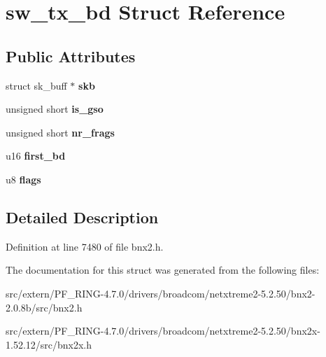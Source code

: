 \hypertarget{structsw__tx__bd}{
\section{sw\_\-tx\_\-bd Struct Reference}
\label{structsw__tx__bd}
}
\subsection*{Public Attributes}
\begin{DoxyCompactItemize}
\item 
\hypertarget{structsw__tx__bd_a47a18c5b8d3300505b5b72c06f40d453}{
struct sk\_\-buff $\ast$ {\bfseries skb}}
\label{structsw__tx__bd_a47a18c5b8d3300505b5b72c06f40d453}

\item 
\hypertarget{structsw__tx__bd_ae7298a394c271425b41347d721d0c481}{
unsigned short {\bfseries is\_\-gso}}
\label{structsw__tx__bd_ae7298a394c271425b41347d721d0c481}

\item 
\hypertarget{structsw__tx__bd_a0325f6895464837c91bc83b95c04e159}{
unsigned short {\bfseries nr\_\-frags}}
\label{structsw__tx__bd_a0325f6895464837c91bc83b95c04e159}

\item 
\hypertarget{structsw__tx__bd_a72bc187a7b6099aba43c32c58c0c75af}{
u16 {\bfseries first\_\-bd}}
\label{structsw__tx__bd_a72bc187a7b6099aba43c32c58c0c75af}

\item 
\hypertarget{structsw__tx__bd_ac604ddedffc0c849708bef96039ffc78}{
u8 {\bfseries flags}}
\label{structsw__tx__bd_ac604ddedffc0c849708bef96039ffc78}

\end{DoxyCompactItemize}


\subsection{Detailed Description}


Definition at line 7480 of file bnx2.h.



The documentation for this struct was generated from the following files:\begin{DoxyCompactItemize}
\item 
src/extern/PF\_\-RING-\/4.7.0/drivers/broadcom/netxtreme2-\/5.2.50/bnx2-\/2.0.8b/src/bnx2.h\item 
src/extern/PF\_\-RING-\/4.7.0/drivers/broadcom/netxtreme2-\/5.2.50/bnx2x-\/1.52.12/src/bnx2x.h\end{DoxyCompactItemize}
